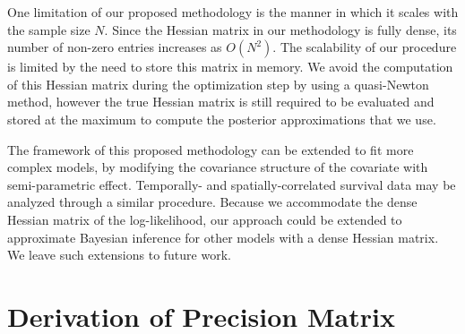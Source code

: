 \documentclass[num-refs,serif,10pt]{wiley-article}
\begin{document}
One limitation of our proposed methodology is the manner in which it scales with the sample size $N$. Since the Hessian matrix in our methodology is fully dense, its number of non-zero entries increases as $O(N^{2})$. The scalability of our procedure is limited by the need to store this matrix in memory. We avoid the computation of this Hessian matrix during the optimization step by using a quasi-Newton method, however the true Hessian matrix is still required to be evaluated and stored at the maximum to compute the posterior approximations that we use.

The framework of this proposed methodology can be extended to fit more complex models, by modifying the covariance structure of the covariate with semi-parametric effect. Temporally- and spatially-correlated survival data may be analyzed through a similar procedure. Because we accommodate the dense Hessian matrix of the log-likelihood, our approach could be extended to approximate Bayesian inference for other models with a dense Hessian matrix. We leave such extensions to future work.



\appendix

\section{Derivation of Precision Matrix}
\end{document}
